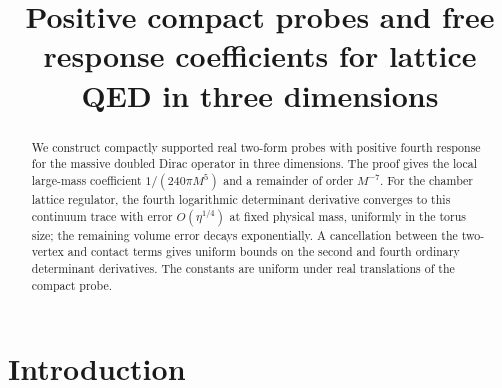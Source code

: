   \RequirePackage[backend=biber,style=alphabetic,backref=true,
    giveninits=true,isbn=false,date=year]{biblatex}
  
  \setcounter{biburlnumpenalty}{100}
  \setcounter{biburllcpenalty}{100}
  \setcounter{biburlucpenalty}{100}
  \renewcommand*{\bibfont}{\footnotesize}
\makeatother
\newcommand{\R}{\mathbb R}
\newcommand{\C}{\mathbb C}
\newcommand{\Z}{\mathbb Z}
\newcommand{\N}{\mathbb N}
\newcommand{\dd}{\mathrm d}
\DeclareMathOperator{\supp}{supp}
\DeclareMathOperator{\tr}{tr}
\DeclareMathOperator{\diag}{diag}
\title[Positive probes and free Dirac response]{Positive compact probes and free response coefficients for lattice QED in three dimensions}
\date{}

\begin{abstract}
We construct compactly supported real two-form probes with positive
fourth response for the massive doubled Dirac operator in three
dimensions. The proof gives the local large-mass coefficient
$1/(240\pi M^5)$ and a remainder of order $M^{-7}$.
For the chamber lattice regulator, the fourth logarithmic
determinant derivative converges to this continuum trace with
error $O(\eta^{1/4})$ at fixed physical mass, uniformly in the
torus size; the remaining volume error decays exponentially.
A cancellation between the two-vertex and contact terms gives
uniform bounds on the second and fourth ordinary determinant
derivatives. The constants are uniform under real translations
of the compact probe.
\end{abstract}
\maketitle
\tableofcontents

\section{Introduction}\label{sec:introduction}

